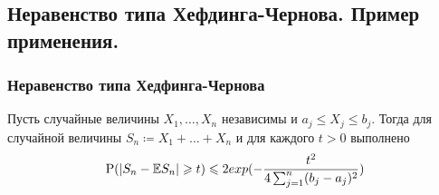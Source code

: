 \subsection{Неравенство типа Хефдинга-Чернова. Пример применения.}

\subsubsection{Неравенство типа Хедфинга-Чернова}
\begin{theorem*}
    Пусть случайные величины $ X_1, \dots, X_n $ независимы и $ a_j \leq X_j \leq b_j. $ Тогда для случайной величины $S_n \coloneqq X_1 + \dots + X_n$ и для каждого $t > 0$ выполнено
    \begin{equation*}
        \P(|S_n - \mathbb{E}S_n| \geq t) \leq 2 exp(-\frac{t^2}{4\sum_{j=1}^{n}(b_j - a_j)^2})
    \end{equation*}
\end{theorem*}

